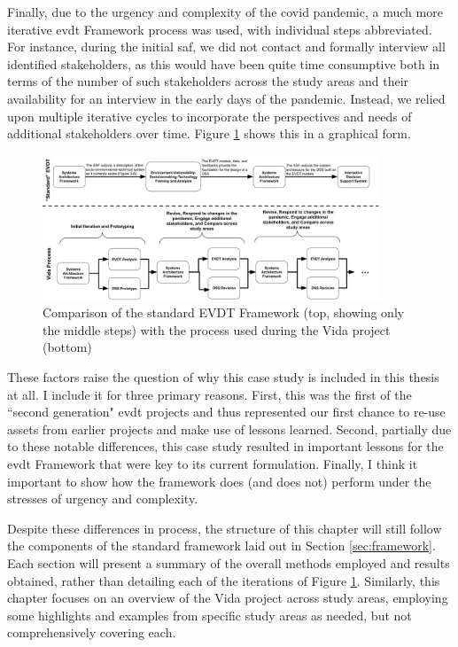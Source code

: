 Finally, due to the urgency and complexity of the \ac{covid} pandemic, a much more iterative \ac{evdt} Framework process was used, with individual steps abbreviated. For instance, during the initial \acf{saf}, we did not contact and formally interview all identified stakeholders, as this would have been quite time consumptive both in terms of the number of such stakeholders across the study areas and their availability for an interview in the early days of the pandemic. Instead, we relied upon multiple iterative cycles to incorporate the perspectives and needs of additional stakeholders over time. Figure \ref{fig:saf-comparison} shows this in a graphical form.

\begin{figure}[!htb]
	\centering
	\includegraphics[width=0.9\textwidth]{Figures/chap5/saf-comparison.png}
	\caption[Comparison of the standard EVDT Framework with the Vida Process]{Comparison of the standard EVDT Framework (top, showing only the middle steps) with the process used during the Vida project (bottom)}
	\label{fig:saf-comparison}
\end{figure}


These factors raise the question of why this case study is included in this thesis at all. I include it for three primary reasons. First, this was the first of the ``second generation" \ac{evdt} projects and thus represented our first chance to re-use assets from earlier projects and make use of lessons learned. Second, partially due to these notable differences, this case study resulted in important lessons for the \ac{evdt} Framework that were key to its current formulation. Finally, I think it important to show how the framework does (and does not) perform under the stresses of urgency and complexity.
	
Despite these differences in process, the structure of this chapter will still follow the components of the standard framework laid out in Section \ref{sec:framework}. Each section will present a summary of the overall methods employed and results obtained, rather than detailing each of the iterations of Figure \ref{fig:saf-comparison}. Similarly, this chapter focuses on an overview of the Vida project across study areas, employing some highlights and examples from specific study areas as needed, but not comprehensively covering each.


